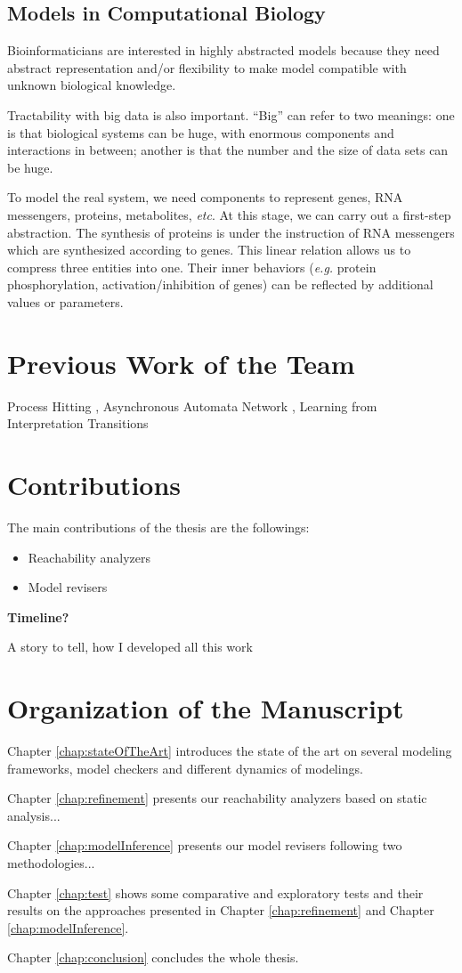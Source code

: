 \subsection{Models in Computational Biology}
Bioinformaticians are interested in highly abstracted models because they need abstract representation and/or flexibility to make model compatible with unknown biological knowledge.

Tractability with big data is also important.
``Big'' can refer to two meanings: one is that biological systems can be huge, with enormous components and interactions in between; another is that the number and the size of data sets can be huge.

To model the real system, we need components to represent genes, RNA messengers, proteins, metabolites, \textit{etc}.
At this stage, we can carry out a first-step abstraction.
The synthesis of proteins is under the instruction of RNA messengers which are synthesized according to genes.
This linear relation allows us to compress three entities into one.
Their inner behaviors (\textit{e.g.} protein phosphorylation, activation/inhibition of genes) can be reflected by additional values or parameters.

\section{Previous Work of the Team}
Process Hitting \cite{pauleve2012}, Asynchronous Automata Network \cite{folschette2015}, Learning from Interpretation Transitions \cite{ribeiro2015learning}

\section{Contributions}
The main contributions of the thesis are the followings:
\begin{itemize}
    \item Reachability analyzers
    \item Model revisers
\end{itemize}

\textbf{Timeline?}

A story to tell, how I developed all this work
\section{Organization of the Manuscript}
Chapter \ref{chap:stateOfTheArt} introduces the state of the art on several modeling frameworks, model checkers and different dynamics of modelings.

Chapter \ref{chap:refinement} presents our reachability analyzers based on static analysis...

Chapter \ref{chap:modelInference} presents our model revisers following two methodologies...

Chapter \ref{chap:test} shows some comparative and exploratory tests and their results on the approaches presented in Chapter \ref{chap:refinement} and Chapter \ref{chap:modelInference}.

Chapter \ref{chap:conclusion} concludes the whole thesis.